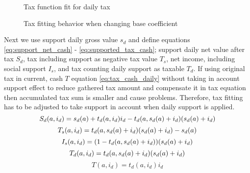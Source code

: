\begin{figure} %
 \begin{center}
  \caption{Tax function fit for daily tax}
  \label{fig:DailyTax} 
 \end{center}
\end{figure}
\begin{figure} %
 \begin{center}
  \caption{Tax fitting behavior when changing base coefficient}
  \label{fig:BaseTax} 
 \end{center}
\end{figure}

Next we use support daily gross value $s_d$ and define equations \ref{eq:support_net_cash} - \ref{eq:supported_tax_cash};
support daily net value after tax $S_d$, tax including support as negative tax value $T_s$, net income,
including social support $I_s$, and tax counting daily support as taxable $T_d$.
If using original tax in current, cash $T$ equation \ref{eq:tax_cash_daily}
without taking in account support effect to reduce gathered tax amount and compensate it in tax equation
then accumulated tax sum is smaller and cause problems.
Therefore, tax fitting has to be adjusted to take support in account when daily support is applied.
\begin{equation} \label{eq:support_net_cash} \index{support daily}
S_d(a,i_d) = s_d(a) + t_d(a,i_d)i_d - t_d(a,s_d(a)+i_d)(s_d(a)+i_d)
\end{equation}
\begin{equation} \label{eq:supported_tax_cash} \index{tax negative}
T_s(a,i_d)=t_d(a,s_d(a)+i_d)(s_d(a)+i_d)-s_d(a)
\end{equation}
\begin{equation} \label{eq:supported_cash_net} \index{income supported}
I_s(a,i_d)=(1-t_d(a,s_d(a)+i_d))(s_d(a)+i_d)
\end{equation}
\begin{equation} \label{eq:supported_tax_cash_daily} \index{tax daily}
T_d(a,i_d)=t_d(a,s_d(a)+i_d)(s_d(a)+i_d)
\end{equation}
\begin{equation} \label{eq:tax_cash_daily}
T(a,i_d)=t_d(a,i_d)i_d
\end{equation}

